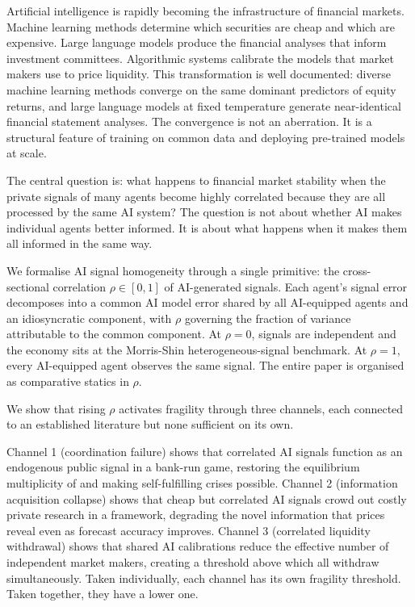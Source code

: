 \label{sec:introduction}

Artificial intelligence is rapidly becoming the infrastructure of financial markets. Machine learning methods determine which securities are cheap and which are expensive. Large language models produce the financial analyses that inform investment committees. Algorithmic systems calibrate the models that market makers use to price liquidity. This transformation is well documented: diverse machine learning methods converge on the same dominant predictors of equity returns, and large language models at fixed temperature generate near-identical financial statement analyses. The convergence is not an aberration. It is a structural feature of training on common data and deploying pre-trained models at scale.

The central question is: what happens to financial market stability when the private signals of many agents become highly correlated because they are all processed by the same AI system? The question is not about whether AI makes individual agents better informed. It is about what happens when it makes them all informed in the same way.

We formalise AI signal homogeneity through a single primitive: the cross-sectional correlation $\rho \in [0,1]$ of AI-generated signals. Each agent's signal error decomposes into a common AI model error shared by all AI-equipped agents and an idiosyncratic component, with $\rho$ governing the fraction of variance attributable to the common component. At $\rho = 0$, signals are independent and the economy sits at the Morris-Shin heterogeneous-signal benchmark. At $\rho = 1$, every AI-equipped agent observes the same signal. The entire paper is organised as comparative statics in $\rho$.

We show that rising $\rho$ activates fragility through three channels, each connected to an established literature but none sufficient on its own.

Channel 1 (coordination failure) shows that correlated AI signals function as an endogenous public signal in a \citet{goldstein2005} bank-run game, restoring the equilibrium multiplicity of \citet{hellwig2002} and making self-fulfilling crises possible. Channel 2 (information acquisition collapse) shows that cheap but correlated AI signals crowd out costly private research in a \citet{grossman1980} framework, degrading the novel information that prices reveal even as forecast accuracy improves. Channel 3 (correlated liquidity withdrawal) shows that shared AI calibrations reduce the effective number of independent market makers, creating a threshold above which all withdraw simultaneously. Taken individually, each channel has its own fragility threshold. Taken together, they have a lower one.

